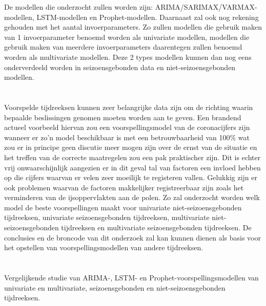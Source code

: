De modellen die onderzocht zullen worden zijn: ARIMA/SARIMAX/VARMAX-modellen, LSTM-modellen en Prophet-modellen. Daarnaast zal ook nog rekening gehouden met het aantal invoerparameters. Zo zullen modellen die gebruik maken van 1 invoerparameter benoemd worden als univariate modellen, modellen die gebruik maken van meerdere invoerparameters daarentegen zullen benoemd worden als multivariate modellen. Deze 2 types modellen kunnen dan nog eens onderverdeeld worden in seizoensgebonden data en niet-seizoensgebonden modellen. 

\section{}
\label{sec:probleemstelling}

Voorspelde tijdreeksen kunnen zeer belangrijke data zijn om de richting waarin bepaalde beslissingen genomen moeten worden aan te geven. Een brandend actueel voorbeeld hiervan zou een voorspellingsmodel van de coronacijfers zijn wanneer er zo'n model beschikbaar is met een betrouwbaarheid van 100\% wat zou er in principe geen discutie meer mogen zijn over de ernst van de situatie en het treffen van de correcte maatregelen zou een pak praktischer zijn. Dit is echter vrij onwaarschijnlijk aangezien er in dit geval tal van factoren een invloed hebben op die cijfers waarvan er velen zeer moeilijk te registeren vallen. 
Gelukkig zijn er ook problemen waarvan de factoren makkelijker registreerbaar zijn zoals het verminderen van de ijsoppervlakten aan de polen. Zo zal onderzocht worden welk model de beste voorspellingen maakt voor univariate niet-seizoensgebonden tijdreeksen, univariate seizoensgebonden tijdreeksen, multivariate niet-seizoensgebonden tijdreeksen en multivariate seizoensgebonden tijdreeksen. De conclusies en de broncode van dit onderzoek zal kan kunnen dienen als basis voor het opstellen van voorspellingsmodellen van andere tijdreeksen.


\section{}
\label{sec:onderzoeksvraag}

Vergelijkende studie van ARIMA-, LSTM- en Prophet-voorspellingsmodellen van univariate en multivariate, seizoensgebonden en niet-seizoensgebonden tijdreeksen.

\section{}
\label{sec:onderzoeksdoelstelling}

